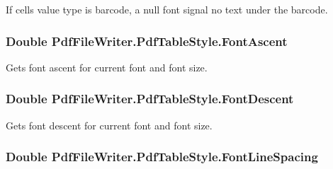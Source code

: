 If cell\textquotesingle{}s value type is barcode, a null font signal no text under the barcode. 
\subsubsection[{\texorpdfstring{Font\+Ascent}{FontAscent}}]{\setlength{\rightskip}{0pt plus 5cm}Double Pdf\+File\+Writer.\+Pdf\+Table\+Style.\+Font\+Ascent\hspace{0.3cm}{\ttfamily [get]}}\hypertarget{class_pdf_file_writer_1_1_pdf_table_style_a7c02d7a8be316e1a2bf84e84533a14c0}{}\label{class_pdf_file_writer_1_1_pdf_table_style_a7c02d7a8be316e1a2bf84e84533a14c0}


Gets font ascent for current font and font size. 

\subsubsection[{\texorpdfstring{Font\+Descent}{FontDescent}}]{\setlength{\rightskip}{0pt plus 5cm}Double Pdf\+File\+Writer.\+Pdf\+Table\+Style.\+Font\+Descent\hspace{0.3cm}{\ttfamily [get]}}\hypertarget{class_pdf_file_writer_1_1_pdf_table_style_a588402d29e5452382432dc8df3622524}{}\label{class_pdf_file_writer_1_1_pdf_table_style_a588402d29e5452382432dc8df3622524}


Gets font descent for current font and font size. 

\subsubsection[{\texorpdfstring{Font\+Line\+Spacing}{FontLineSpacing}}]{\setlength{\rightskip}{0pt plus 5cm}Double Pdf\+File\+Writer.\+Pdf\+Table\+Style.\+Font\+Line\+Spacing\hspace{0.3cm}{\ttfamily [get]}}\hypertarget{class_pdf_file_writer_1_1_pdf_table_style_a01527bc2956f9464c2f0be882205aa64}{}\label{class_pdf_file_writer_1_1_pdf_table_style_a01527bc2956f9464c2f0be882205aa64}


